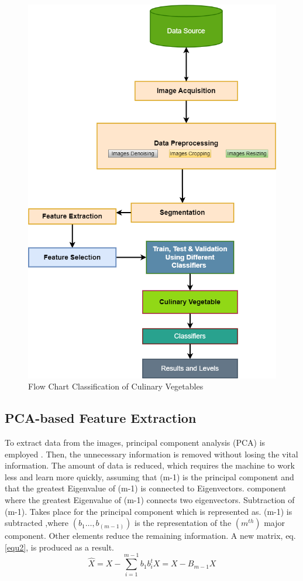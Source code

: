 \documentclass[a4paper,fleqn]{cas-sc}
\begin{document}
\begin{figure}
\centering
\includegraphics[scale=0.5]{flowchart}
\caption{Flow Chart Classification of Culinary Vegetables }
\label{}
\end{figure}

\subsection{PCA-based Feature Extraction}
\par To extract data from the images, principal component analysis (PCA) is employed \cite{wu2018review}. Then, the unnecessary information is removed without losing the vital information. The amount of data is reduced, which requires the machine to work less and learn more quickly, assuming that (m-1) is the principal component and that the greatest Eigenvalue of (m-1) is connected to Eigenvectors. component where the greatest Eigenvalue of (m-1) connects two eigenvectors. Subtraction of (m-1). Takes place for the principal component which is represented as. (m-1) is subtracted ,where $(b_1 \dots ,b_(m-1))$ is the representation of the $(m^{th})$ major component. Other elements reduce the remaining information. A new matrix, eq.\ref{equ2}, is produced as a result.
\begin{equation}\label{equ2}
\hat{X}=X- \sum_{i=1}^{m-1} b_1b_i^t X=X-B_{m-1}X
\end{equation}
          
\end{document}
